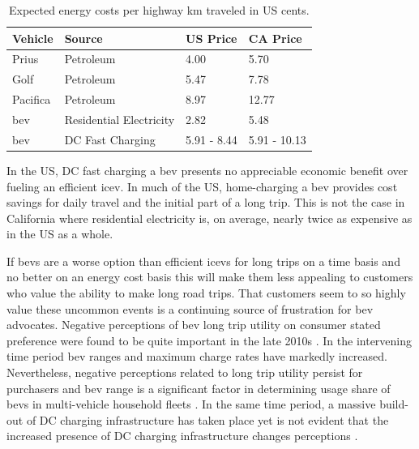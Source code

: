 \begin{multicols}{2}
\begin{table}[H]
	\centering
	\caption{Expected energy costs per highway km traveled in US cents.}
	\label{tab:expected_energy_costs_per_km}
	\begin{tabular}{|C{\linewidth / 4}|C{\linewidth / 4}|C{\linewidth / 4}|C{\linewidth / 4}|}
		\hline Vehicle & Source & US Price & CA Price \\
		\hline Prius & Petroleum & 4.00 & 5.70 \\
		\hline Golf & Petroleum & 5.47 & 7.78 \\
		\hline Pacifica & Petroleum & 8.97 & 12.77 \\
		\hline \gls{bev} & Residential Electricity & 2.82 & 5.48 \\
		\hline \gls{bev} & DC Fast Charging & 5.91 - 8.44 & 5.91 - 10.13 \\
		\hline
	\end{tabular}
\end{table}

In the US, DC fast charging a \gls{bev} presents no appreciable economic benefit over fueling an efficient \gls{icev}. In much of the US, home-charging a \gls{bev} provides cost savings for daily travel and the initial part of a long trip. This is not the case in California where residential electricity is, on average, nearly twice as expensive as in the US as a whole.

If \glspl{bev} are a worse option than efficient \glspl{icev} for long trips on a time basis and no better on an energy cost basis this will make them less appealing to customers who value the ability to make long road trips. That customers seem to so highly value these uncommon events is a continuing source of frustration for \gls{bev} advocates. Negative perceptions of \gls{bev} long trip utility on consumer stated preference were found to be quite important in the late 2010s \cite{Skippon_2016, Hardman_2016, Franke_2017, Schmalfuss_2017}. In the intervening time period \gls{bev} ranges and maximum charge rates have markedly increased. Nevertheless, negative perceptions related to long trip utility persist for purchasers \cite{Bhat_2022, Paradies_2023, Corradi_2023, Philip_2023} and \gls{bev} range is a significant factor in determining usage share of \glspl{bev} in multi-vehicle household fleets \cite{Chakraborty_2022}. In the same time period, a massive build-out of DC charging infrastructure has taken place yet is not evident that the increased presence of DC charging infrastructure changes perceptions \cite{Hoogland_2023}.


\end{multicols}
